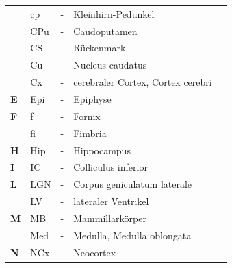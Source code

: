 \documentclass[12pt,a4paper,pdftex]{article}
\begin{document}
\begin{table}[H]
\begin{tabular}{llcll}
\textbf{}  & cp  & -          & Kleinhirn-Pedunkel                                                      & \multicolumn{1}{c}{}          \\
\textbf{}  & CPu & -          & Caudoputamen                                                            &                               \\
\textbf{}  & CS  & -          & Rückenmark                                                              &                               \\
\textbf{}  & Cu  & -          & Nucleus caudatus                                                        &                               \\
\textbf{}  & Cx  & -          & cerebraler Cortex, Cortex cerebri          &                               \\
\textbf{E} & Epi & -          & Epiphyse                                                                &                               \\
\textbf{F} & f   & -          & Fornix                                                                  &                               \\
\textbf{}  & fi  & -          & Fimbria                                                                 &                               \\
\textbf{H} & Hip & -          & Hippocampus                                                             &                               \\
\textbf{I} & IC  & -          & Colliculus inferior                                                     &                               \\
\textbf{L} & LGN & -          & Corpus geniculatum laterale                                             &                               \\
\textbf{}  & LV  & -          & lateraler Ventrikel                                                     &                               \\
\textbf{M} & MB  & -          & Mammillarkörper                                                         &                               \\
\textbf{}  & Med & -          & Medulla, Medulla oblongata                  &                               \\
\textbf{N} & NCx & -          & Neocortex                                                               &                               \\

\end{tabular}
\end{table}
\end{document}
